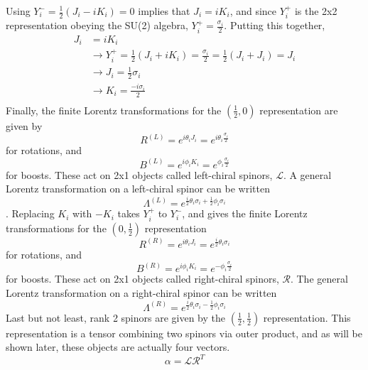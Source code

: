 Using $Y_{i}^{-} = \frac{1}{2}(J_i - iK_i) = 0$ implies that $J_i = iK_i$, and since $Y_{i}^{+}$ is the 2x2 representation obeying the SU(2) algebra, $Y_{i}^{+} = \frac{\sigma_i}{2}$. Putting this together,
\begin{equation}
\begin{split}
J_i &= iK_i \\ 
&\rightarrow Y^+_i = \frac{1}{2}(J_i + iK_i) = \frac{\sigma_i}{2} = \frac{1}{2}(J_i + J_i) = J_i \\
&\rightarrow J_i = \frac{1}{2}\sigma_i \\
&\rightarrow K_i = \frac{-i\sigma_i}{2} \\
\end{split}
\end{equation} 
Finally, the finite Lorentz transformations for the $(\frac{1}{2}, 0)$ representation are given by 
\begin{equation}
R^{(L)} = e^{i\theta_i J_i} = e^{i\theta_i \frac{\sigma_i}{2}}   
\end{equation}
for rotations, and
\begin{equation}
B^{(L)} = e^{i\phi_i K_i} = e^{\phi_i \frac{\sigma_i}{2}}   
\end{equation}
for boosts. These act on 2x1 objects called left-chiral spinors, $\mathcal{L}$. A general Lorentz transformation on a left-chiral spinor can be written
\begin{equation}
\Lambda^{(L)} = e^{\frac{i}{2}\theta_i \sigma_i + \frac{1}{2}\phi_i \sigma_i}
\end{equation}.
Replacing $K_i$ with $-K_i$ takes $Y^+_i$ to $Y^-_i$, and gives the finite Lorentz transformations for the $(0, \frac{1}{2})$ representation 
\begin{equation}
R^{(R)} = e^{i\theta_i J_i} = e^{\frac{i}{2}\theta_i \sigma_i}   
\end{equation}
for rotations, and
\begin{equation}
B^{(R)} = e^{i\phi_i K_i} = e^{-\phi_i \frac{\sigma_i}{2}}   
\end{equation}
for boosts. These act on 2x1 objects called right-chiral spinors, $\mathcal{R}$. The general Lorentz transformation on a right-chiral spinor can be written
\begin{equation}
\Lambda^{(R)} = e^{\frac{i}{2}\theta_i \sigma_i - \frac{1}{2}\phi_i \sigma_i}
\end{equation}
Last but not least, rank 2 spinors are given by the $(\frac{1}{2}, \frac{1}{2})$ representation. This representation is a tensor combining two spinors via outer product, and as will be shown later, these objects are actually four vectors.
\begin{equation}
\alpha = \mathcal{L} \mathcal{R}^{T}
\end{equation}

